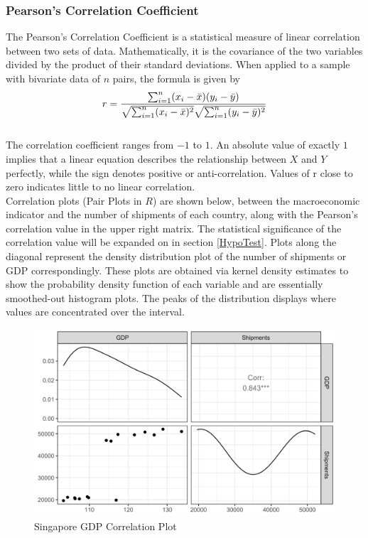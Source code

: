 \documentclass{article}
\begin{document}
\subsubsection{Pearson's Correlation Coefficient}
The Pearson's Correlation Coefficient is a statistical measure of linear correlation between two sets of data. Mathematically, it is the covariance of the two variables divided by the product of their standard deviations. When applied to a sample with bivariate data of $n$ pairs, the formula is given by \\

\begin{equation}
    r = \frac{ \sum_{i=1}^{n}(x_i-\bar{x})(y_i-\bar{y}) }{%
        \sqrt{\sum_{i=1}^{n}(x_i-\bar{x})^2}\sqrt{\sum_{i=1}^{n}(y_i-\bar{y})^2}}
\end{equation} \\

\noindent The correlation coefficient ranges from $-1$ to $1$. An absolute value of exactly $1$ implies that a linear equation describes the relationship between $X$ and $Y$ perfectly, while the sign denotes positive or anti-correlation. Values of r close to zero indicates little to no linear correlation. \\

\noindent Correlation plots (Pair Plots in $R$) are shown below, between the macroeconomic indicator and the number of shipments of each country, along with the Pearson's correlation value in the upper right matrix. The statistical significance of the correlation value will be expanded on in section \ref{HypoTest}. Plots along the diagonal represent the density distribution plot of the number of shipments or GDP correspondingly. These plots are obtained via kernel density estimates to show the probability density function of each variable and are essentially smoothed-out histogram plots. The peaks of the distribution displays where values are concentrated over the interval. \\

\begin{figure}[H]
    \centering
    \includegraphics[width=1\textwidth]{images/Line Plots/Singapore/Singapore_Corrplot.png}
    \caption{Singapore GDP Correlation Plot}
    \label{fig:my_label}
\end{figure}
\end{document}
